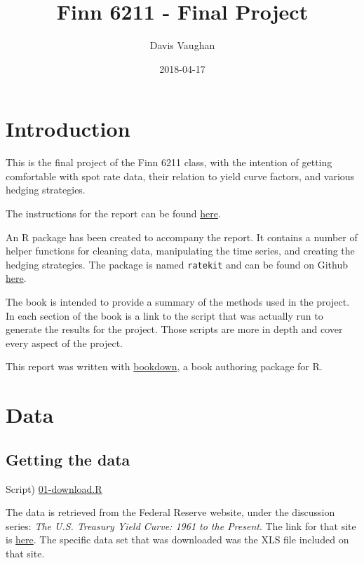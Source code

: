 \documentclass[]{book}
\title{Finn 6211 - Final Project}
\author{Davis Vaughan}
\date{2018-04-17}
\theoremstyle{definition}
\theoremstyle{definition}
\theoremstyle{definition}
\theoremstyle{remark}
\begin{document}
\maketitle

{
\setcounter{tocdepth}{1}
\tableofcontents
}
\hypertarget{titlepage}{%
\chapter{Introduction}\label{titlepage}}

This is the final project of the Finn 6211 class, with the intention of
getting comfortable with spot rate data, their relation to yield curve
factors, and various hedging strategies.

The instructions for the report can be found
\href{./instructions/Hedging_Project_S18.pdf}{here}.

An R package has been created to accompany the report. It contains a
number of helper functions for cleaning data, manipulating the time
series, and creating the hedging strategies. The package is named
\texttt{ratekit} and can be found on Github
\href{https://github.com/DavisVaughan/ratekit}{here}.

The book is intended to provide a summary of the methods used in the
project. In each section of the book is a link to the script that was
actually run to generate the results for the project. Those scripts are
more in depth and cover every aspect of the project.

This report was written with
\href{https://bookdown.org/yihui/bookdown/}{bookdown}, a book authoring
package for R.

\hypertarget{data}{%
\chapter{Data}\label{data}}

\hypertarget{retrieve}{%
\section{Getting the data}\label{retrieve}}

Script) \href{./R/01-download.R}{01-download.R}

The data is retrieved from the Federal Reserve website, under the
discussion series: \emph{The U.S. Treasury Yield Curve: 1961 to the
Present}. The link for that site is
\href{https://www.federalreserve.gov/pubs/feds/2006/200628/200628abs.html}{here}.
The specific data set that was downloaded was the XLS file included on
that site.
\end{document}
